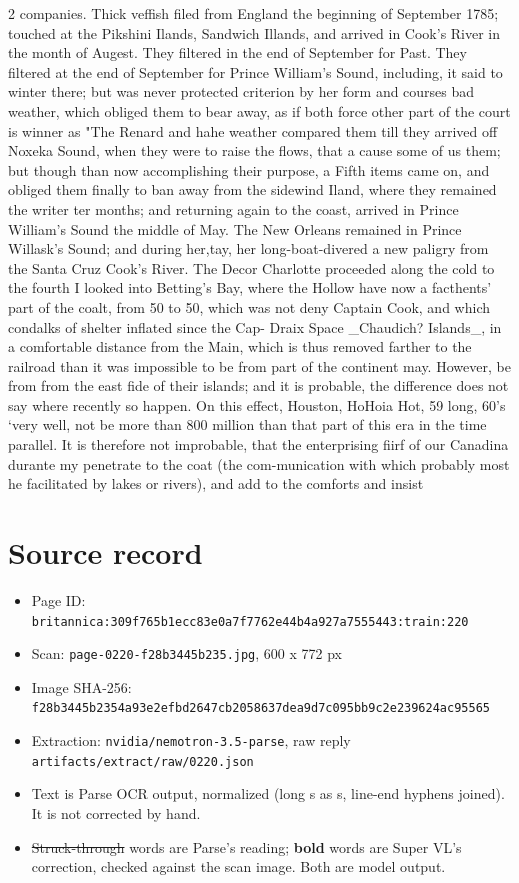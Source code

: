\documentclass[10pt]{article}
\begin{document}
\begin{multicols}{2}
companies. Thick veffish filed from England the beginning of September 1785; touched at the Pikshini Ilands, Sandwich Illands, and arrived in Cook's River in the month of Augest. They filtered in the end of September for Past. They filtered at the end of September for Prince William's Sound, including, it said to winter there; but was never protected criterion by her form and courses bad weather, which obliged them to bear away, as if both force other part of the court is winner as "The Renard and hahe weather compared them till they arrived off Noxeka Sound, when they were to raise the flows, that a cause some of us them; but though than now accomplishing their purpose, a Fifth items came on, and obliged them finally to ban away from the sidewind Iland, where they remained the writer ter months; and returning again to the coast, arrived in Prince William's Sound the middle of May. The New Orleans remained in Prince Willask's Sound; and during her,tay, her long-boat-divered a new paligry from the Santa Cruz Cook's River. The Decor Charlotte proceeded along the cold to the fourth I looked into Betting's Bay, where the Hollow have now a facthents' part of the coalt, from 50 to 50, which was not deny Captain Cook, and which condalks of shelter inflated since the Cap- Draix Space \_Chaudich? Islands\_, in a comfortable distance from the Main, which is thus removed farther to the railroad than it was impossible to be from part of the continent may. However, be from from the east fide of their islands; and it is probable, the difference does not say where recently so happen. On this effect, Houston, HoHoia Hot, 59 long, 60’s ‘very well, not be more than 800 million than that part of this era in the time parallel. It is therefore not improbable, that the enterprising fiirf of our Canadina durante my penetrate to the coat (the com-munication with which probably most he facilitated by lakes or rivers), and add to the comforts and insist
\end{multicols}
\section*{Source record}
\begin{itemize}
\item Page ID: \texttt{britannica:309f765b1ecc83e0a7f7762e44b4a927a7555443:train:220}
\item Scan: \texttt{page-0220-f28b3445b235.jpg}, 600 x 772 px
\item Image SHA-256: \texttt{\small f28b3445b2354a93e2efbd2647cb2058637dea9d7c095bb9c2e239624ac95565}
\item Extraction: \texttt{nvidia/nemotron-3.5-parse}, raw reply \texttt{artifacts/extract/raw/0220.json}
\item Text is Parse OCR output, normalized (long s as s, line-end hyphens joined). It is not corrected by hand.
\item \sout{Struck-through} words are Parse's reading; \textbf{bold} words are Super VL's correction, checked against the scan image. Both are model output.
\end{itemize}
\end{document}
